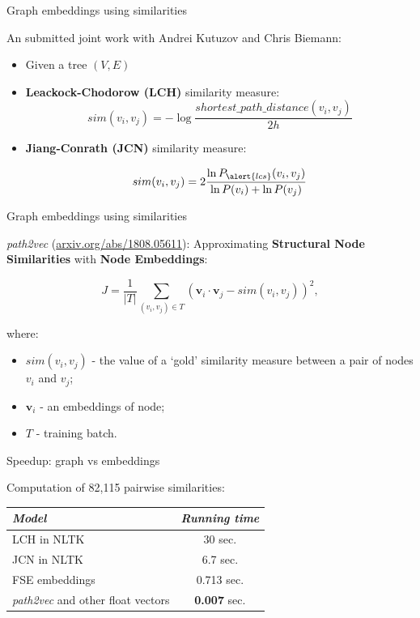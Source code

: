 \begin{frame}{Graph embeddings using similarities}

An submitted joint work with Andrei Kutuzov and Chris Biemann:


\begin{itemize}
\item Given a tree $(V, E)$

\item \alert{\textbf{Leackock-Chodorow (LCH)}} similarity measure:
$$
sim(v_i, v_j)= −\log\frac{shortest\_path\_distance(v_i, v_j) }{2h} 
$$

\pause 
\item \alert{\textbf{Jiang-Conrath (JCN)}} similarity measure:

$$
sim(v_i, v_j) = 2 \frac{\ln P_{\alert{lcs}}(v_i, v_j)}{\ln P(v_i) + \ln P(v_j)} 
$$
\end{itemize}
	
\end{frame}



\begin{frame}{Graph embeddings using similarities}


\textit{path2vec} (\url{arxiv.org/abs/1808.05611}): Approximating \alert{\textbf{Structural Node Similarities}} with \textbf{Node Embeddings}:

$$
J = \frac{1}{|T|}  \sum_{ (v_i, v_j) \in T }  (\mathbf{v}_i \cdot \mathbf{v}_j - sim(v_i, v_j) )^2,
$$

where:

\begin{itemize}
	\item $sim(v_i, v_j)$ - the value of a `gold' similarity measure between a pair of nodes $v_i$ and $v_j$;
	\item $\mathbf{v}_i$ - an embeddings of node;
	\item $T$ - training batch.
\end{itemize}

\end{frame}

\begin{frame}{Speedup: graph vs embeddings}	

Computation of 82,115 pairwise similarities:

\begin{table}
\begin{tabular}{lc}
\toprule
\textit{Model} & \textit{Running time} \\
\midrule
LCH in NLTK & 30 sec. \\
JCN in NLTK & 6.7 sec. \\
FSE embeddings & 0.713 sec. \\
\textit{path2vec} and other float vectors & \textbf{0.007} sec. \\
\bottomrule
\end{tabular}
\end{table}

\end{frame}


